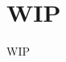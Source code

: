 \chapter[WIP]{WIP}
\label{chap:Chapter3}
\doublespacing
\fontsize{14}{14}\selectfont
\indent WIP \cite{clegg}
